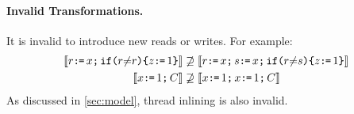 



\paragraph{Invalid Transformations.}
It is invalid to introduce new reads or writes.  For example:
\begin{align*}
  \sem{\aReg \GETS \aLoc \SEMI \IF{\aReg {\neq} \aReg} \THEN \cLoc \GETS 1 \FI}
  &\not\supseteq
  \sem{\aReg \GETS \aLoc \SEMI \bReg \GETS \aLoc  \SEMI \IF{\aReg {\neq}\bReg} \THEN \cLoc \GETS 1 \FI}
  \\
  \sem{\aLoc \GETS 1 \SEMI \aCmd} 
  &\not\supseteq
  \sem{\aLoc \GETS 1 \SEMI \aLoc \GETS 1 \SEMI \aCmd}
\end{align*}
As discussed in \textsection\ref{sec:model}, thread inlining is also invalid.

